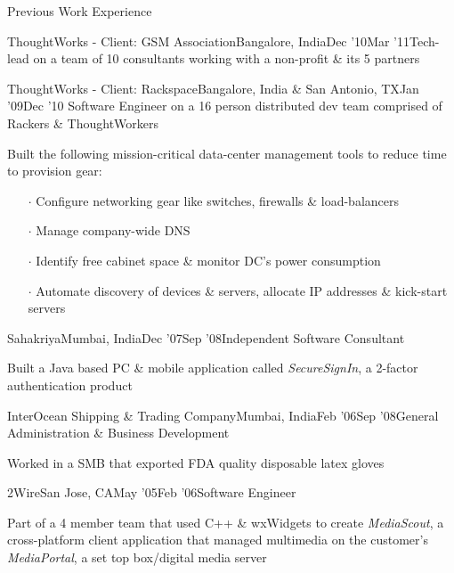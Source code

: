 \documentclass{resume} %
\begin{document}
\begin{rSection}{Previous Work Experience}
\begin{rSubsection}{ThoughtWorks - Client: GSM Association}{Bangalore, India}{Dec '10}{Mar '11}{Tech-lead on a team of 10 consultants working with a non-profit
  \& its 5 partners}
\end{rSubsection}



\begin{rSubsection}{ThoughtWorks - Client: Rackspace}{Bangalore, India \& San Antonio,
  TX}{Jan '09}{Dec '10}
{Software Engineer on a 16 person distributed dev team comprised of Rackers \& ThoughtWorkers}

\item Built the following mission-critical data-center management tools to reduce time to provision gear:
\vspace{-0.5em}
\begin{itemize}  \itemsep0.5pt \parskip0pt
    \item[$\cdot$] Configure networking gear like switches, firewalls \& load-balancers
    \item[$\cdot$] Manage company-wide DNS
    \item[$\cdot$] Identify free cabinet space \& monitor DC's power consumption
    \item[$\cdot$] Automate discovery of devices \& servers, allocate IP addresses \& kick-start servers
\end{itemize}

\end{rSubsection}


\begin{rSubsection}{Sahakriya}{Mumbai, India}{Dec '07}{Sep '08}{Independent Software Consultant}
\item Built a Java based PC \& mobile application called {\em SecureSignIn}, a 2-factor authentication product

\end{rSubsection}


\begin{rSubsection}{InterOcean Shipping \& Trading Company}{Mumbai,
    India}{Feb '06}{Sep '08}{General Administration \& Business Development}
\item Worked in a SMB that exported FDA quality disposable latex gloves
\end{rSubsection}


\begin{rSubsection}{2Wire}{San Jose, CA}{May '05}{Feb '06}{Software Engineer}
\item Part of a 4 member team that used C++ \& wxWidgets to create {\em MediaScout}, a cross-platform client application that managed multimedia on the customer's {\em MediaPortal}, a set top box/digital media server
\end{rSubsection}

\end{rSection}
\end{document}
